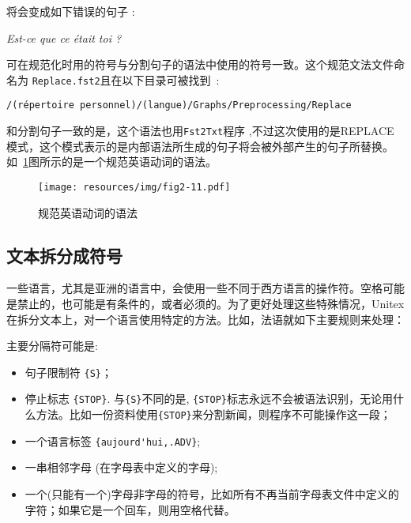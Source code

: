 \bigskip
\noindent 将会变成如下错误的句子 :

\bigskip
\textit{Est-ce que ce était toi ?}


\bigskip
\noindent 可在规范化时用的符号与分割句子的语法中使用的符号一致。这个规范文法文件命名为
\verb+Replace.fst2+且在以下目录可被找到~:

\bigskip \verb+/(répertoire personnel)/(langue)/Graphs/Preprocessing/Replace+

\bigskip
\noindent 和分割句子一致的是，这个语法也用\verb+Fst2Txt+程序 ,不过这次使用的是REPLACE模式，这个模式表示的是内部语法所生成的句子将会被外部产生的句子所替换。如~\ref{fig-normalization-grammar}图所示的是一个规范英语动词的语法。

\begin{figure}[!p]
\begin{center}
\texttt{[image: resources/img/fig2-11.pdf]}
\caption{规范英语动词的语法\label{fig-normalization-grammar}}
\end{center}
\end{figure}



\subsection{文本拆分成符号}
\label{tokenization}
一些语言，尤其是亚洲的语言中，会使用一些不同于西方语言的操作符。空格可能是禁止的，也可能是有条件的，或者必须的。为了更好处理这些特殊情况，Unitex在拆分文本上，对一个语言使用特定的方法。比如，法语就如下主要规则来处理：

\bigskip
\noindent 主要分隔符可能是:
\begin{itemize}
  \item 句子限制符 \verb+{S}+；
  \item 停止标志 \verb+{STOP}+. 与\verb+{S}+不同的是, \verb+{STOP}+标志永远不会被语法识别，无论用什么方法。比如一份资料使用\verb+{STOP}+来分割新闻，则程序不可能操作这一段；
  \item 一个语言标签 \verb+{aujourd'hui,.ADV}+;
  \item 一串相邻字母 (在字母表中定义的字母);
  \item 一个(只能有一个)字母非字母的符号，比如所有不再当前字母表文件中定义的字符；如果它是一个回车，则用空格代替。
\end{itemize}

